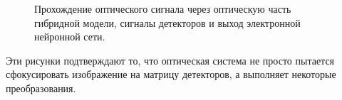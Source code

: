 \begin{figure}[h]
	\caption{Прохождение оптического сигнала через оптическую часть гибридной модели, сигналы детекторов и выход электронной нейронной сети.}
	\label{ris:ModelWork3}
\end{figure}
Эти рисунки подтверждают то, что оптическая система не просто пытается сфокусировать изображение на матрицу детекторов, а выполняет некоторые преобразования.
